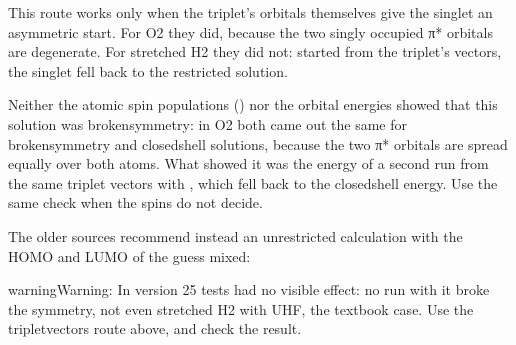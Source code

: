 \documentclass[letterpaper,10pt,english,openany,oneside]{sphinxmanual}
\begin{document}
\sphinxAtStartPar
This route works only when the triplet’s orbitals themselves give the singlet an asymmetric start. For O2 they did,
because the two singly occupied π* orbitals are degenerate. For stretched H2 they did not: started from the
triplet’s vectors, the singlet fell back to the restricted solution.



\sphinxAtStartPar
Neither the atomic spin populations () nor the orbital energies showed that this solution was
broken\sphinxhyphen{}symmetry: in O2 both came out the same for broken\sphinxhyphen{}symmetry and closed\sphinxhyphen{}shell solutions, because the two π*
orbitals are spread equally over both atoms. What showed it was the energy of a second run from the same triplet
vectors with , which fell back to the closed\sphinxhyphen{}shell energy. Use the same check when the spins do not
decide.



\sphinxAtStartPar
The older sources recommend instead an unrestricted calculation with the HOMO and LUMO of the guess mixed:

\begin{sphinxVerbatim}[commandchars=\\\{\}]
\end{sphinxVerbatim}



\begin{sphinxadmonition}{warning}{Warning:}
\sphinxAtStartPar
In version 25 tests  had no visible effect: no run with it broke the symmetry, not even stretched H2 with
UHF, the textbook case. Use the triplet\sphinxhyphen{}vectors route above, and check the result.
\end{sphinxadmonition}
\end{document}
